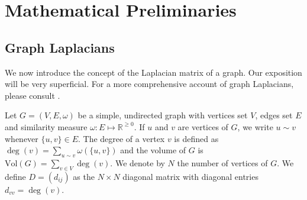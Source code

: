 \section{Mathematical Preliminaries}

\subsection{Graph Laplacians}
\label{sec:graph-laplacians}
We now introduce the concept of the Laplacian matrix of a graph. Our
exposition will be very superficial. For a more comprehensive account
of graph Laplacians, please consult \cite{chung05:_laplac_cheeg,cvetkovic80:_spect_graph_theor_applic}.

Let $G = (V,E,\omega)$ be a simple, undirected graph with vertices set
$V$, edges set $E$ and similarity measure $\omega \colon E \mapsto
\mathbb{R}^{\geq 0}$. If $u$ and $v$ are vertices of $G$, we write $u \sim v$
whenever $\{u,v\} \in E$. The degree of a vertex $v$ is defined as
$\deg(v) = \sum_{u \sim v}{\omega(\{u,v\})}$ and the volume of $G$ is
$\mathrm{Vol}(G) = \sum_{v \in V}{\deg(v)}$.  We denote by $N$ the
number of vertices of $G$. We define $D = (d_{ij})$ as the $N \times
N$ diagonal matrix with diagonal entries $d_{vv} = \deg(v)$.

